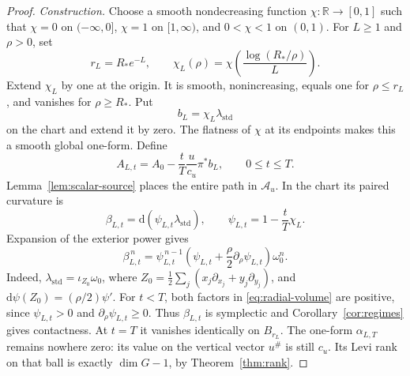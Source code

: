 \documentclass[11pt,a4paper]{article}
\numberwithin{equation}{section}
\theoremstyle{definition}
\theoremstyle{remark}
\newcommand{\R}{\mathbb R}
\newcommand{\dd}{\mathrm d}
\begin{document}
\begin{proof}
\smallskip\noindent
\emph{Construction.}
Choose a smooth nondecreasing function $\chi:\R\to[0,1]$ such that
$\chi=0$ on $(-\infty,0]$, $\chi=1$ on $[1,\infty)$, and $0<\chi<1$ on $(0,1)$.
For $L\geq1$ and $\rho>0$, set
\begin{equation}\label{eq:log-cutoff}
 r_L=R_*e^{-L},\qquad
 \chi_L(\rho)=\chi\!\left(\frac{\log(R_*/\rho)}{L}\right).
\end{equation}
Extend $\chi_L$ by one at the origin. It is smooth, nonincreasing, equals
one for $\rho\leq r_L$, and vanishes for $\rho\geq R_*$. Put
\[
 b_L=\chi_L\lambda_{\mathrm{std}}
\]
on the chart and extend it by zero. The flatness of $\chi$ at its endpoints
makes this a smooth global one-form. Define
\begin{equation}\label{eq:critical-path}
 A_{L,t}=A_0-\frac{t}{T}\frac{u}{c_u}\pi^*b_L,
 \qquad 0\leq t\leq T.
\end{equation}
Lemma~\ref{lem:scalar-source} places the entire path in $\mathcal A_u$.
In the chart its paired curvature is
\[
 \beta_{L,t}=\dd(\psi_{L,t}\lambda_{\mathrm{std}}),\qquad
 \psi_{L,t}=1-\frac{t}{T}\chi_L.
\]
Expansion of the exterior power gives
\begin{equation}\label{eq:radial-volume}
 \beta_{L,t}^{\,n}
 =\psi_{L,t}^{\,n-1}
   \left(\psi_{L,t}+\frac{\rho}{2}\partial_\rho \psi_{L,t}\right)
      \omega_0^n.
\end{equation}
Indeed,
$\lambda_{\mathrm{std}}=\iota_{Z_0}\omega_0$, where
$Z_0=\frac12\sum_j(x_j\partial_{x_j}+y_j\partial_{y_j})$, and
$\dd\psi(Z_0)=(\rho/2)\psi'$. For $t<T$, both factors in
\eqref{eq:radial-volume} are positive, since $\psi_{L,t}>0$ and
$\partial_\rho \psi_{L,t}\geq0$. Thus $\beta_{L,t}$ is symplectic and
Corollary~\ref{cor:regimes} gives contactness. At $t=T$ it vanishes
identically on $B_{r_L}$. The one-form $\alpha_{L,T}$ remains nowhere zero:
its value on the vertical vector $u^\#$ is still $c_u$. Its Levi rank on
that ball is exactly $\dim G-1$, by Theorem~\ref{thm:rank}.


\end{proof}
\end{document}
